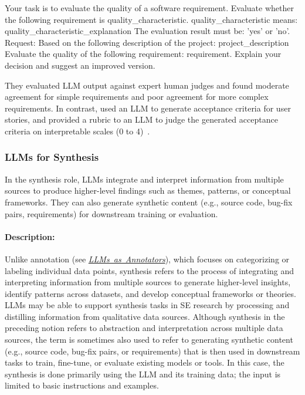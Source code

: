 \documentclass[smallextended]{svjour3}
\newcommand{\annotators}{\hyperref[sec:llms-as-annotators]{\mbox{\emph{LLMs as Annotators}}}\xspace}
\newcommand{\annotators}{\href{/study-types/annotators/}{\emph{LLMs as Annotators}}\xspace}
\newcommand{\studytypesubsection}[1]{\subsubsection{#1}}
\newcommand{\studytypeparagraph}[1]{\paragraph{\bfseries #1:}}
\newcommand{\studytypesubsection}[1]{\subsection{#1}}
\newcommand{\studytypeparagraph}[1]{\subsubsection{#1}}
\begin{document}
\begin{plain}
Your task is to evaluate the quality of a software requirement.
Evaluate whether the following requirement is {quality_characteristic}.
{quality_characteristic} means: {quality_characteristic_explanation}
The evaluation result must be: 'yes' or 'no'.
Request: Based on the following description of the project: {project_description}
Evaluate the quality of the following requirement: {requirement}.
Explain your decision and suggest an improved version.
\end{plain}

They evaluated LLM output against expert human judges and found moderate agreement for simple requirements and poor agreement for more complex requirements. In contrast, \citeauthor{DBLP:conf/kbse/WangALHTASL25} used an LLM to generate acceptance criteria for user stories, and provided a rubric to an LLM to judge the generated acceptance criteria on interpretable scales (0 to 4)~\cite{DBLP:conf/kbse/WangALHTASL25}.
\space%

\studytypesubsection{LLMs for Synthesis}
\label{sec:llms-for-synthesis}

In the synthesis role, LLMs integrate and interpret information from multiple sources to produce higher-level findings such as themes, patterns, or conceptual frameworks. They can also generate synthetic content (e.g., source code, bug-fix pairs, requirements) for downstream training or evaluation.

\studytypeparagraph{Description}

Unlike annotation (see \annotators), which focuses on categorizing or labeling individual data points, synthesis refers to the process of integrating and interpreting information from multiple sources to generate higher-level insights, identify patterns across datasets, and develop conceptual frameworks or theories. LLMs may be able to support synthesis tasks in SE research by processing and distilling information from qualitative data sources. 
Although synthesis in the preceding notion refers to abstraction and interpretation across multiple data sources, the term is sometimes also used to refer to generating synthetic content (e.g., source code, bug-fix pairs, or requirements) that is then used in downstream tasks to train, fine-tune, or evaluate existing models or tools.
In this case, the synthesis is done primarily using the LLM and its training data; the input is limited to basic instructions and examples.
\end{document}

